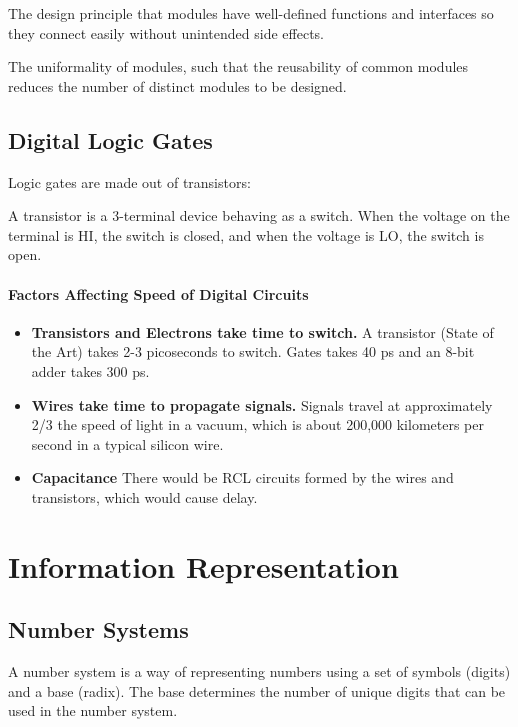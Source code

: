\documentclass[11pt]{report}
\begin{document}
\begin{shaded}
\begin{definition}[Modularity]
    The design principle that modules have well-defined functions and interfaces so they connect easily without unintended side effects.
\end{definition}

\begin{definition}[Regularity]
    The uniformality of modules, such that the reusability of common modules reduces the number of distinct modules to be designed.
\end{definition}

\subsection{Digital Logic Gates}
Logic gates are made out of transistors:
\begin{definition}[Transistor]
    A transistor is a 3-terminal device behaving as a switch. When the voltage on the terminal is HI, the switch is closed, and when the voltage is LO, the switch is open.
\end{definition}

\paragraph{Factors Affecting Speed of Digital Circuits}
\begin{itemize}
    \item \textbf{Transistors and Electrons take time to switch.} A transistor (State of the Art) takes 2-3 picoseconds to switch. Gates takes 40 ps and an 8-bit adder takes 300 ps.
    \item \textbf{Wires take time to propagate signals.} Signals travel at approximately 2/3 the speed of light in a vacuum, which is about 200,000 kilometers per second in a typical silicon wire.
    \item \textbf{Capacitance} There would be RCL circuits formed by the wires and transistors, which would cause delay.
\end{itemize}

\end{shaded}

\section{Information Representation}

\subsection{Number Systems}
\begin{definition}
    A number system is a way of representing numbers using a set of symbols (digits) and a base (radix). The base determines the number of unique digits that can be used in the number system.
\end{definition}
\end{document}

